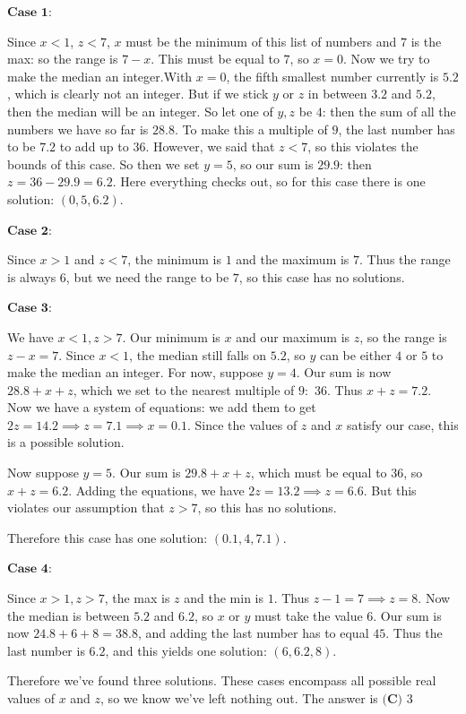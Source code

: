 \begin{enumerate}
 $\textbf{Case 1:}$

 Since $x<1$, $z<7$, $x$ must be the minimum of this list of numbers and $7$ is the max: so the range is $7-x$. This must be equal to $7$, so $x=0$. Now we try to make the median an integer.With $x=0$, the fifth smallest number currently is $5.2$, which is clearly not an integer. But if we stick $y$ or $z$ in between $3.2$ and $5.2$, then the median will be an integer. So let one of $y,z$ be $4$: then the sum of all the numbers we have so far is $28.8$. To make this a multiple of $9$, the last number has to be $7.2$ to add up to $36$. However, we said that $z<7$, so this violates the bounds of this case. So then we set $y=5$, so our sum is $29.9$: then $z=36-29.9 = 6.2$. Here everything checks out, so for this case there is one solution: $(0,5,6.2)$.

 $\textbf{Case 2:}$

 Since $x>1$ and $z<7$, the minimum is $1$ and the maximum is $7$. Thus the range is always $6$, but we need the range to be $7$, so this case has no solutions.

 $\textbf{Case 3:}$

 We have $x<1, z>7$. Our minimum is $x$ and our maximum is $z$, so the range is $z-x = 7$. Since $x<1$, the median still falls on $5.2$, so $y$ can be either $4$ or $5$ to make the median an integer. For now, suppose $y=4$. Our sum is now $28.8+x+z$, which we set to the nearest multiple of $9:$ $36$. Thus $x+z = 7.2$. Now we have a system of equations: we add them to get $2z = 14.2 \implies z = 7.1 \implies x = 0.1$. Since the values of $z$ and $x$ satisfy our case, this is a possible solution.

 Now suppose $y=5$. Our sum is $29.8+x+z$, which must be equal to $36$, so $x+z = 6.2$. Adding the equations, we have $2z = 13.2 \implies z = 6.6$. But this violates our assumption that $z>7$, so this has no solutions.

 Therefore this case has one solution: $(0.1,4,7.1)$.

 $\textbf{Case 4:}$

 Since $x>1, z>7$, the max is $z$ and the min is $1$. Thus $z-1 = 7 \implies z = 8$. Now the median is between $5.2$ and $6.2$, so $x$ or $y$ must take the value $6$. Our sum is now $24.8+6+8 = 38.8$, and adding the last number has to equal $45$. Thus the last number is $6.2$, and this yields one solution: $(6,6.2,8)$.

 


 
Therefore we've found three solutions. These cases encompass all possible real values of $x$ and $z$, so we know we've left nothing out. The answer is $\boxed{\textbf{(C) }3}$





\end{enumerate}
